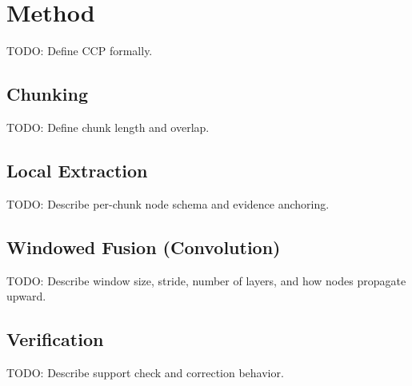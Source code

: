 \section{Method}

TODO: Define CCP formally.

\subsection{Chunking}
TODO: Define chunk length and overlap.

\subsection{Local Extraction}
TODO: Describe per-chunk node schema and evidence anchoring.

\subsection{Windowed Fusion (Convolution)}
TODO: Describe window size, stride, number of layers, and how nodes propagate upward.

\subsection{Verification}
TODO: Describe support check and correction behavior.

